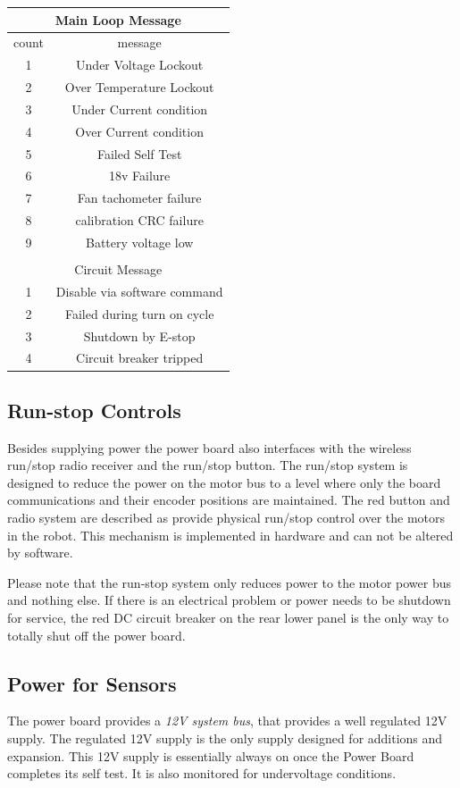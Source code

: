 \begin{tabular}{|c|c|}
\hline
\multicolumn{2}{|c|}{Main Loop Message} \\
\hline
count &  message \\
\hline
\hline
1 & Under Voltage Lockout \\
\hline
2 & Over Temperature Lockout \\
\hline
3 & Under Current condition \\
\hline
4 & Over Current condition \\
\hline
5 & Failed Self Test \\
\hline
6 & 18v Failure \\
\hline
7 & Fan tachometer failure \\
\hline
8 & calibration CRC failure \\
\hline
9 & Battery voltage low  \\
\hline
& \\
\hline
\multicolumn{2}{|c|}{Circuit Message} \\
\hline
1 & Disable via software command \\
\hline
2 & Failed during turn on cycle \\
\hline
3 & Shutdown by E-stop \\
\hline
4 & Circuit breaker tripped  \\
\hline
\end{tabular}

\subsection {Run-stop Controls}

Besides supplying power the power board also interfaces with the wireless run/stop
radio receiver and the run/stop button. The run/stop system is
designed to reduce the power on the motor bus to a level where only the board
communications and their encoder positions are maintained. The red button and
radio system are described as provide physical run/stop control over the
motors in the robot. This mechanism is
implemented in hardware and can not be altered by software.

Please note that the run-stop system only reduces power to the motor power bus
and nothing else. If there is an electrical problem or power needs to be
shutdown for service, the red DC circuit breaker on the rear lower panel is the
only way to totally shut off the power board.


\subsection{Power for Sensors}
The power board provides a \emph{12V system bus}, that
provides a well regulated 12V supply. The regulated 12V supply is the only
supply designed for additions and expansion. This 12V supply is essentially
always on once the Power Board completes its self test. It is also monitored for
undervoltage conditions.

